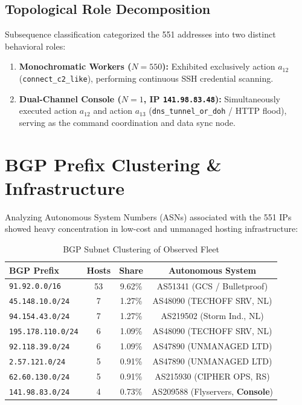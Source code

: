 \documentclass[10pt,twocolumn]{article}
\begin{document}
\subsection{Topological Role Decomposition}
Subsequence classification categorized the 551 addresses into two distinct behavioral roles:
\begin{enumerate}
    \item \textbf{Monochromatic Workers ($N = 550$):} Exhibited exclusively action $a_{12}$ (\texttt{connect\_c2\_like}), performing continuous SSH credential scanning.
    \item \textbf{Dual-Channel Console ($N = 1$, IP \texttt{141.98.83.48}):} Simultaneously executed action $a_{12}$ and action $a_{13}$ (\texttt{dns\_tunnel\_or\_doh} / HTTP flood), serving as the command coordination and data sync node.
\end{enumerate}

\section{BGP Prefix Clustering \& Infrastructure}
Analyzing Autonomous System Numbers (ASNs) associated with the 551 IPs showed heavy concentration in low-cost and unmanaged hosting infrastructure:

\begin{table}[h]
\centering
\small
\caption{BGP Subnet Clustering of Observed Fleet}
\label{tab:asn}
\begin{tabular}{lccc}
\toprule
\textbf{BGP Prefix} & \textbf{Hosts} & \textbf{Share} & \textbf{Autonomous System} \\
\midrule
\texttt{91.92.0.0/16} & 53 & 9.62\% & AS51341 (GCS / Bulletproof) \\
\texttt{45.148.10.0/24} & 7 & 1.27\% & AS48090 (TECHOFF SRV, NL) \\
\texttt{94.154.43.0/24} & 7 & 1.27\% & AS219502 (Storm Ind., NL) \\
\texttt{195.178.110.0/24} & 6 & 1.09\% & AS48090 (TECHOFF SRV, NL) \\
\texttt{92.118.39.0/24} & 6 & 1.09\% & AS47890 (UNMANAGED LTD) \\
\texttt{2.57.121.0/24} & 5 & 0.91\% & AS47890 (UNMANAGED LTD) \\
\texttt{62.60.130.0/24} & 5 & 0.91\% & AS215930 (CIPHER OPS, RS) \\
\texttt{141.98.83.0/24} & 4 & 0.73\% & AS209588 (Flyservers, \textbf{Console}) \\
\bottomrule
\end{tabular}
\end{table}
\end{document}
